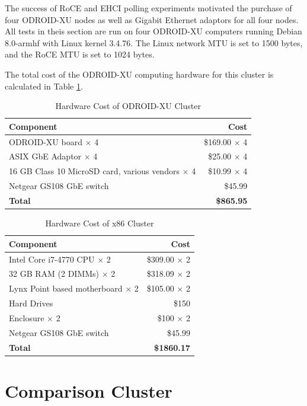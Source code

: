 \documentclass[11pt]{book}
\begin{document}
The success of RoCE and EHCI polling experiments motivated the purchase of four ODROID-XU
nodes as well as Gigabit Ethernet adaptors for all four nodes.  All tests in theis section
are run on four ODROID-XU computers running Debian 8.0-armhf with Linux kernel 3.4.76.
The Linux network MTU is set to 1500 bytes, and the RoCE MTU is set to 1024 bytes.

The total cost of the ODROID-XU computing hardware for this cluster is calculated in Table
\ref{xu-cost-table}.

\begin{table}
  \caption{Hardware Cost of ODROID-XU Cluster}\label{xu-cost-table}
  \centering
  \begin{tabular}{| l | r |}
    \hline
    \textbf{Component} & \textbf{Cost} \\ \hline
    ODROID-XU board $\times$ 4 & \$169.00 $\times$ 4 \\
    ASIX GbE Adaptor $\times$ 4 & \$25.00 $\times$ 4 \\
    16 GB Class 10 MicroSD card, various vendors $\times$ 4 & \$10.99 $\times$ 4 \\
    Netgear GS108 GbE switch & \$45.99 \\
    \hline
    \textbf{Total} & \textbf{\$865.95} \\ \hline
  \end{tabular}
\end{table}

\begin{table}
  \caption{Hardware Cost of x86 Cluster}\label{x86-cost-table}
  \centering
  \begin{tabular}{| l | r |}
    \hline
    \textbf{Component} & \textbf{Cost} \\
    \hline
    Intel Core i7-4770 CPU $\times$ 2 & \$309.00 $\times$ 2 \\
    32 GB RAM (2 DIMMs) $\times$ 2 & \$318.09 $\times$ 2 \\
    Lynx Point based motherboard $\times$ 2 & \$105.00 $\times$ 2 \\
    Hard Drives & \$150 \\
    Enclosure $\times$ 2 & \$100 $\times$ 2 \\
    Netgear GS108 GbE switch & \$45.99 \\
    \hline
    \textbf{Total} & \textbf{\$1860.17} \\ \hline
  \end{tabular}
\end{table}

\section{Comparison Cluster}
\end{document}
